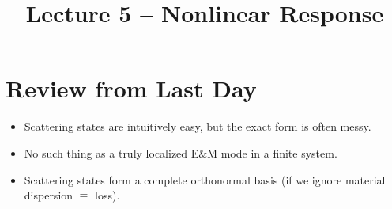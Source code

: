 \documentclass[12pt]{article}
\title{Lecture 5 -- Nonlinear Response}
\date{}
\begin{document}
\maketitle

\section{Review from Last Day}
\begin{itemize}
  \item Scattering states are intuitively easy, but the exact form is often messy.
  \item No such thing as a truly localized E\&M mode in a finite system.
  \item Scattering states form a complete orthonormal basis (if we ignore material dispersion $\equiv$ loss).
\end{itemize}
\end{document}
